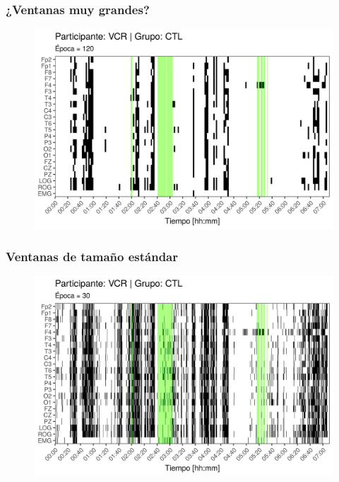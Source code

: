 \documentclass[serif,mathserif,professionalfont]{beamer}
\begin{document}


\begin{frame}\frametitle{¿Ventanas muy grandes?}
\begin{figure}
\centering
\includegraphics[width=0.9\linewidth]
{./img_art_dfa/zoom_emergencia_VCR_120.png} 
\end{figure}
\end{frame}

\begin{frame}\frametitle{Ventanas de tamaño estándar}
\begin{figure}
\centering
\includegraphics[width=0.9\linewidth]
{./img_art_dfa/zoom_emergencia_VCR_30.png} 
\end{figure}
\end{frame}
\end{document}
